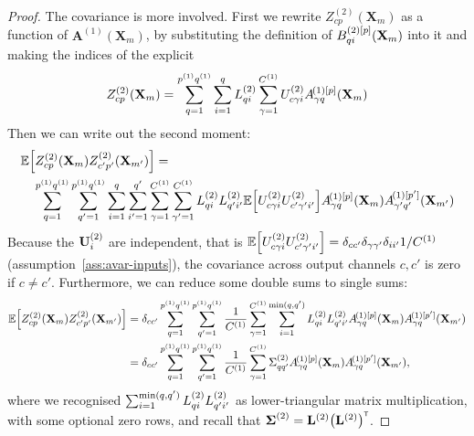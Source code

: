 \documentclass[tablecaption=bottom,wcp,nonatbib]{jmlr} %
\newcommand{\vX}{\mathbf{X}}
\newcommand{\vA}{\mathbf{A}}
\newcommand{\tp}{{\mathrm{\textsf{\tiny T}}}}
\newcommand{\bracket}[3]{{\left#1 #3 \right#2}}
\newcommand{\bra}{\bracket{(}{)}}
\newcommand{\sqb}{\bracket{[}{]}}
\begin{document}
{{\begin{proof}
  The covariance is more involved. First we rewrite $Z_{cp}^{(2)}(\vX_m)$ as a
  function of $\vA^{(1)}(\vX_m)$, by substituting the definition of
  $\layerBsp{(2)[\patch]}{\patchidx i}(\vX_m)$ into it and making the indices of
  the \MatMul explicit
  \begin{equation}
    Z_{cp}^{(2)}(\vX_m) = \sum_{\patchidx=1}^{\patchsize{1}} \sum_{i=1}^{\patchidx}
    \priorLscov{2}_{\patchidx i}  \sum_{\gamma=1}^{\layerC{1}} \layerUs{2}_{c\gamma i}
    \layerNLAsmp{(1)[\patch]}{\gamma\patchidx}{\vX_m}
  \end{equation}
  Then we can write out the second moment:
  \begin{equation}
    \begin{aligned}
    &\ExpSymb\sqb{Z_{cp}^{(2)}(\vX_m) Z_{c'p'}^{(2)}(\vX_{m'})} =  \\
    &\hspace{1em} \sum_{\patchidx=1}^{\patchsize{1}} \sum_{\patchidx'=1}^{\patchsize{1}}
                  \sum_{i=1}^{\patchidx}\sum_{i'=1}^{\patchidx'}
                  \sum_{\gamma=1}^{\layerC{1}} \sum_{\gamma'=1}^{\layerC{1}} 
                  \priorLscov{2}_{\patchidx i} \priorLscov{2}_{\patchidx' i'}
                  \ExpSymb\sqb{\layerUs{2}_{c\gamma i}
                  \layerUs{2}_{c'\gamma' i'}}
                  \layerNLAsmp{(1)[\patch]}{\gamma\patchidx}{\vX_m}
                  \layerNLAsmp{(1)[\patch']}{\gamma'\patchidx'}{\vX_{m'}}
  \end{aligned}
  \end{equation}
  Because the $\mathbf{U}^{(2)}_{i}$ are independent, that is
  $ \ExpSymb\sqb{\layerUs{2}_{c\gamma i}
    \layerUs{2}_{c'\gamma' i'}} = \delta_{cc'} \delta_{\gamma\gamma'}
  \delta_{ii'} 1/\layerC{1}$ (assumption~\ref{ass:avar-inputs}),
  the covariance across output channels $c, c'$ is zero if $c\neq c'$.
  Furthermore, we can reduce some double sums to single sums:
  \begin{align}
    \ExpSymb\sqb{Z_{cp}^{(2)}(\vX_m) Z_{c'p'}^{(2)}(\vX_{m'})} &= \delta_{cc'}
    \sum_{\patchidx=1}^{\patchsize{1}}
    \sum_{\patchidx'=1}^{\patchsize{1}}
    \frac{1}{\layerC{1}}\sum_{\gamma=1}^{\layerC{1}}
    \sum_{i=1}^{\text{min}(\patchidx, \patchidx')}
    \priorLscov{2}_{\patchidx i} \priorLscov{2}_{\patchidx' i'}
    \layerNLAsmp{(1)[\patch]}{\gamma\patchidx}{\vX_m}
    \layerNLAsmp{(1)[\patch']}{\gamma\patchidx}{\vX_{m'}} \\
                                                              &= \delta_{cc'}\sum_{\patchidx=1}^{\patchsize{1}}
    \sum_{\patchidx'=1}^{\patchsize{1}}
    \frac{1}{\layerC{1}}\sum_{\gamma=1}^{\layerC{1}}
    \priorWcovs{2}_{\patchidx \patchidx'}
    \layerNLAsmp{(1)[\patch]}{\gamma\patchidx}{\vX_m}
    \layerNLAsmp{(1)[\patch']}{\gamma\patchidx}{\vX_{m'}},
  \end{align}
  where we recognised $ \sum_{i=1}^{\text{min}(q, q')}
  L^{(2)}_{q i} L^{(2)}_{q' i'}$ as lower-triangular matrix multiplication, with some optional zero rows,
  and recall that $\priorWcov{2} = \priorLcov{2}\bra{\priorLcov{2}}^\tp$.


\end{proof}}}
\end{document}
